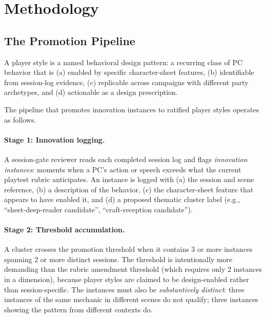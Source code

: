 
\section{Methodology}
\label{sec:methodology}

\subsection{The Promotion Pipeline}

A player style is a named behavioral design pattern: a recurring class of PC behavior
that is (a) enabled by specific character-sheet features, (b) identifiable from
session-log evidence, (c) replicable across campaigns with different party archetypes,
and (d) actionable as a design prescription.

The pipeline that promotes innovation instances to ratified player styles operates as
follows.

\paragraph{Stage 1: Innovation logging.}
A session-gate reviewer reads each completed session log and flags \textit{innovation
instances}: moments when a PC's action or speech exceeds what the current playtest
rubric anticipates. An instance is logged with (a) the session and scene reference,
(b) a description of the behavior, (c) the character-sheet feature that appears to
have enabled it, and (d) a proposed thematic cluster label (e.g., ``sheet-deep-reader
candidate'', ``craft-reception candidate'').

\paragraph{Stage 2: Threshold accumulation.}
A cluster crosses the promotion threshold when it contains 3 or more instances spanning
2 or more distinct sessions. The threshold is intentionally more demanding than the
rubric amendment threshold (which requires only 2 instances in a dimension), because
player styles are claimed to be design-enabled rather than session-specific. The
instances must also be \textit{substantively distinct}: three instances of the same
mechanic in different scenes do not qualify; three instances showing the pattern from
different contexts do.

